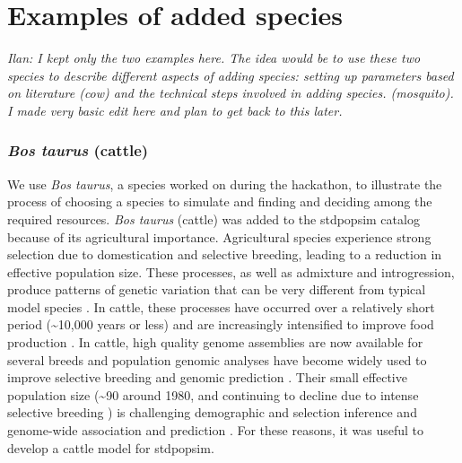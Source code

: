 \documentclass[hidelinks]{article}
\begin{document}
\hypertarget{sec5}{%
	\section*{Examples of added species}\label{sec:std-sim}}

\noindent\emph{Ilan: I kept only the two examples here. The idea would be to
use these two species to describe different aspects of adding species: setting up parameters based on literature (cow) and the technical steps involved in adding species.  (mosquito).
I made very basic edit here and plan to get back to this later.\vspace{5pt}}

\hypertarget{bos-taurus}{%
	\subsubsection*{\texorpdfstring{\emph{Bos
				taurus} (cattle)}{Bos taurus (cattle)}}\label{bos-taurus}}

We use \emph{Bos taurus}, a species worked on during the hackathon, to
illustrate the process of choosing a species to simulate and finding and
deciding among the required resources.
%
%
\emph{Bos taurus} (cattle) was added to the stdpopsim catalog 
because of its agricultural importance. Agricultural species experience
strong selection due to domestication and selective breeding, leading
to a reduction in effective population size. These processes,
as well as admixture and introgression, produce patterns
of genetic variation that can be very different from typical model
species \citep{Larson2013}. In cattle, these processes have occurred over a
relatively short period (\textasciitilde 10,000 years or less) and are
increasingly intensified to improve food production \citep{Gaut2018,
MacLeod2013}. In cattle, high quality genome assemblies are now
available for several breeds \citep[e.g.,][]{Rosen2020, Heaton2021,
Talenti2022} and population genomic analyses have become widely used to
improve selective breeding and genomic prediction \citep{Meuwissen2001,
MacLeod2014, Obsteter2021}. Their small effective population size
(\textasciitilde 90 around 1980, and continuing to decline due to intense
selective breeding \citep{MacLeod2013, VanRaden2020, Makanjouloa2020}) is
challenging demographic and selection inference \citep{MacLeod2013,
Hartfield2022} and genome-wide association and prediction
\citep{MacLeod2014}. For these reasons, it was useful to develop a
cattle model for stdpopsim.
\end{document}
